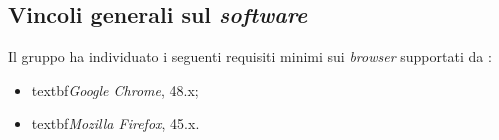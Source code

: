 \subsection{Vincoli generali sul \textit{software}}
Il gruppo ha individuato i seguenti requisiti minimi sui \textit{browser} supportati da :
\begin{itemize}
\item textbf{\textit{Google Chrome}},  48.x;
\item textbf{\textit{Mozilla Firefox}},  45.x.
\end{itemize}

\newpage
